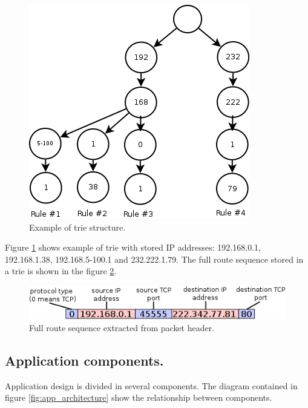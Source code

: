 \documentclass[thesis=M,english]{FITthesis}[2011/07/15]
\begin{document}
\begin{figure}[h]
\centering
\includegraphics[scale=0.6]{images/trie.png}
\caption{Example of trie structure.}
\label{fig:trie_example}
\end{figure}

Figure \ref{fig:trie_example} shows example of trie with stored IP addresses: 192.168.0.1, 192.168.1.38, 192.168.5-100.1 and 232.222.1.79. The full route sequence stored in a trie is shown in the figure \ref{fig:route_sequence}.

\begin{figure}[h]
\centering
\includegraphics[scale=0.8]{images/route_sequence.png}
\caption{Full route sequence extracted from packet header.}
\label{fig:route_sequence}
\end{figure}

\subsection*{Application components.}
Application design is divided in several components. The diagram contained in figure \ref{fig:app_architecture} show the relationship between components.
\end{document}
